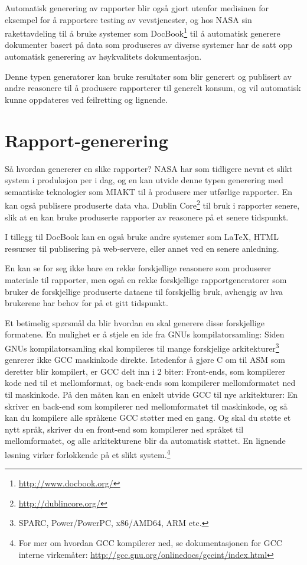 \documentclass[11pt]{article}
\begin{document}
Automatisk generering av rapporter blir også gjort utenfor medisinen for eksempel for å rapportere testing av vevstjenester\cite{ webrepgen}, og hos NASA\cite{modbasedrepgen} sin rakettavdeling til å bruke systemer som DocBook\footnote{\url{http://www.docbook.org/}} til å automatisk generere dokumenter basert på data som produseres av diverse systemer har de satt opp automatisk generering av høykvalitets dokumentasjon.

Denne typen generatorer kan bruke resultater som blir generert og publisert av andre reasonere til å produsere rapporterer til generelt konsum, og vil automatisk kunne oppdateres ved feilretting og lignende.

\section{Rapport-generering}
Så hvordan genererer en slike rapporter?
NASA har som tidligere nevnt et slikt system i produksjon per i dag\cite{modbasedrepgen}, og en kan utvide denne typen generering med semantiske teknologier som MIAKT\cite{repgenmiakt} til å produsere mer utførlige rapporter.
En kan også publisere produserte data vha. Dublin Core\footnote{\url{http://dublincore.org/}} til bruk i rapporter senere, slik at en kan bruke produserte rapporter av reasonere på et senere tidspunkt.

I tillegg til DocBook kan en også bruke andre systemer som \LaTeX, HTML ressurser til publisering på web-servere, eller annet ved en senere anledning.

En kan se for seg ikke bare en rekke forskjellige reasonere som produserer materiale til rapporter, men også en rekke forskjellige rapportgeneratorer som bruker de forskjellige produserte dataene til forskjellig bruk, avhengig av hva brukerene har behov for på et gitt tidspunkt.

Et betimelig spørsmål da blir hvordan en skal generere disse forskjellige formatene.
En mulighet er å stjele en ide fra GNUs kompilatorsamling: Siden GNUs kompilatorsamling skal kompileres til mange forskjelige arkitekturer\footnote{SPARC, Power/PowerPC, x86/AMD64, ARM etc.} genrerer ikke GCC maskinkode direkte. Istedenfor å gjøre C om til ASM som deretter blir kompilert, er GCC delt inn i 2 biter:
Front-ends, som kompilerer kode ned til et mellomformat, og back-ends som kompilerer mellomformatet ned til maskinkode.
På den måten kan en enkelt utvide GCC til nye arkitekturer: En skriver en back-end som kompilerer ned mellomformatet til maskinkode, og så kan du kompilere alle språkene GCC støtter med en gang.
Og skal du støtte et nytt språk, skriver du en front-end som kompilerer ned språket til mellomformatet, og alle arkitekturene blir da automatisk støttet.
En lignende løsning virker forlokkende på et slikt system.\footnote{For mer om hvordan GCC kompilerer ned, se dokumentasjonen for GCC interne virkemåter: \url{http://gcc.gnu.org/onlinedocs/gccint/index.html}}
\end{document}

